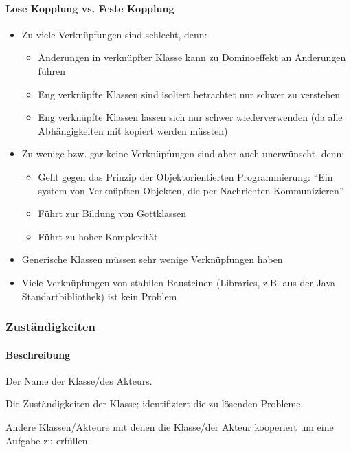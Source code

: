 \documentclass[
    ngerman,
    color=3b,
    summary,
    boxarc,
    main,
]{rubos-tuda-template}
\begin{document}
\paragraph{Lose Kopplung vs. Feste Kopplung}
\begin{itemize}
    \item Zu viele Verknüpfungen sind schlecht, denn:\begin{itemize}
              \item Änderungen in verknüpfter Klasse kann zu Dominoeffekt an Änderungen führen
              \item Eng verknüpfte Klassen sind isoliert betrachtet nur schwer zu verstehen
              \item Eng verknüpfte Klassen lassen sich nur schwer wiederverwenden (da alle Abhängigkeiten mit kopiert werden müssten)
          \end{itemize}
    \item Zu wenige bzw. gar keine Verknüpfungen sind aber auch unerwünscht, denn:\begin{itemize}
              \item Geht gegen das Prinzip der Objektorientierten Programmierung: "`Ein system von Verknüpften Objekten, die per Nachrichten Kommunizieren"'
              \item Führt zur Bildung von Gottklassen
              \item Führt zu hoher Komplexität
          \end{itemize}
    \item Generische Klassen müssen sehr wenige Verknüpfungen haben
    \item Viele Verknüpfungen von stabilen Bausteinen (Libraries, z.B. aus der Java-Standartbibliothek) ist kein Problem
\end{itemize}
\clearpage
\subsubsection{Zuständigkeiten}

\paragraph{Beschreibung}\mbox{}\par
\begin{description}[leftmargin = 3cm]
    \item[Class] Der Name der Klasse/des Akteurs.
    \item[Responsibilities] Die Zuständigkeiten der Klasse; identifiziert die zu lösenden Probleme.
    \item[Collaborations] Andere Klassen/Akteure mit denen die Klasse/der Akteur kooperiert um eine Aufgabe zu erfüllen.
\end{description}
\end{document}
